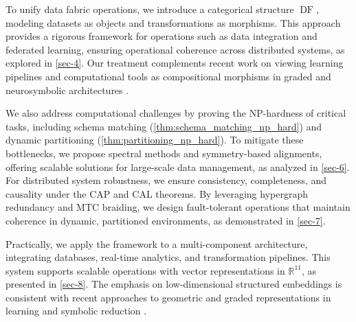 \documentclass{amsart}
\newcommand\R{\mathbb R}
\DeclareMathOperator\DF{DF}
\begin{document}
To unify data fabric operations, we introduce a categorical structure \( \DF \), modeling datasets as objects and transformations as morphisms. This approach provides a rigorous framework for operations such as data integration and federated learning, ensuring operational coherence across distributed systems, as explored in \cref{sec-4}. Our treatment complements recent work on viewing learning pipelines and computational tools as compositional morphisms in graded and neurosymbolic architectures \cite{sh-111, 2024-06}.

We also address computational challenges by proving the NP-hardness of critical tasks, including schema matching (\cref{thm:schema_matching_np_hard}) and dynamic partitioning (\cref{thm:partitioning_np_hard}). To mitigate these bottlenecks, we propose spectral methods and symmetry-based alignments, offering scalable solutions for large-scale data management, as analyzed in \cref{sec-6}. For distributed system robustness, we ensure consistency, completeness, and causality under the CAP and CAL theorems. By leveraging hypergraph redundancy and MTC braiding, we design fault-tolerant operations that maintain coherence in dynamic, partitioned environments, as demonstrated in \cref{sec-7}.

Practically, we apply the framework to a multi-component architecture, integrating databases, real-time analytics, and transformation pipelines. This system supports scalable operations with vector representations in \( \R^{11} \), as presented in \cref{sec-8}. The emphasis on low-dimensional structured embeddings is consistent with recent approaches to geometric and graded representations in learning and symbolic reduction \cite{sh-89, 2024-05}.
\end{document}
